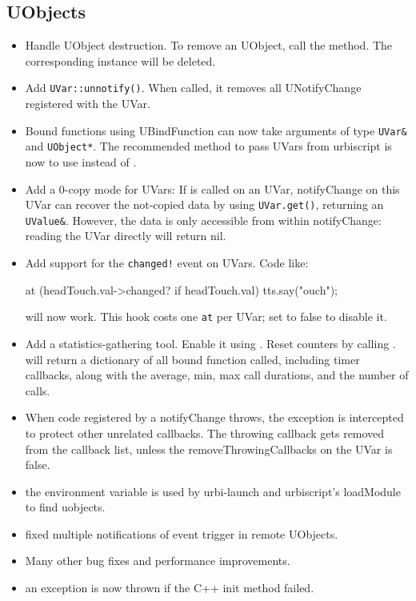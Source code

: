 \subsection{UObjects}
\begin{itemize}
\item Handle UObject destruction. To remove an UObject, call the \us
   method. The corresponding \Cxx instance will be deleted.

\item Add \lstinline|UVar::unnotify()|. When called, it removes all
  UNotifyChange registered with the UVar.

\item Bound functions using UBindFunction can now take arguments of type
  \lstinline|UVar&| and \lstinline|UObject*|. The recommended method to pass
  UVars from urbiscript is now to use  instead
  of .

\item Add a 0-copy mode for UVars: If  is
  called on an UVar, notifyChange on this UVar can recover the not-copied
  data by using \lstinline|UVar.get()|, returning an
  \lstinline|UValue&|. However, the data is only accessible from within
  notifyChange: reading the UVar directly will return nil.

\item Add support for the \lstinline|changed!| event on UVars. Code like:

\begin{urbiunchecked}
at (headTouch.val->changed? if headTouch.val)
  tts.say("ouch");
\end{urbiunchecked}
  \noindent
  will now work. This hook costs one \lstinline|at| per UVar; set
   to false to disable it.

\item Add a statistics-gathering tool. Enable it using
  . Reset counters by calling
  .  will return a
  dictionary of all bound \Cxx function called, including timer callbacks,
  along with the average, min, max call durations, and the number of calls.

\item When code registered by a notifyChange throws, the exception is
  intercepted to protect other unrelated callbacks. The throwing
  callback gets removed from the callback list, unless the
  removeThrowingCallbacks on the UVar is false.

\item the environment variable  is used by
  urbi-launch and urbiscript's loadModule to find uobjects.

\item fixed multiple notifications of event trigger in remote UObjects.

\item Many other bug fixes and performance improvements.

\item an exception is now thrown if the C++ init method failed.
\end{itemize}


